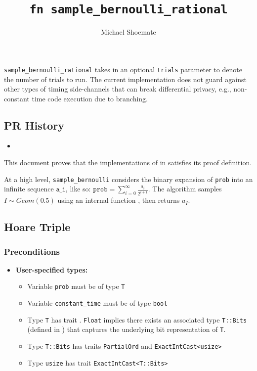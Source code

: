 \documentclass{article}
\title{\texttt{fn sample\_bernoulli\_rational}}
\author{Michael Shoemate}
\begin{document}
\maketitle

\contrib
\begin{tcolorbox}
    \begin{warning}
     \texttt{sample\_bernoulli\_rational} takes in an optional \texttt{trials} parameter to denote the number of trials to run. The current implementation does not guard against other types of timing side-channels that can break differential privacy, e.g., non-constant time code execution due to branching.
    \end{warning}
\end{tcolorbox}

\subsection*{PR History}
\begin{itemize}
    \item {}
\end{itemize}

This document proves that the implementations of  in 
satisfies its proof definition.

At a high level, \texttt{sample\_bernoulli} considers the binary expansion of \texttt{prob} into an infinite sequence $\texttt{a\_i}$,
like so: $\texttt{prob} = \sum_{i = 0}^{\infty} \frac{a_i}{2^{i + 1}}$.
The algorithm samples $I \sim Geom(0.5)$ using an internal function , then returns $a_I$.

\subsection{Hoare Triple}
\subsubsection*{Preconditions}
\begin{itemize}
    \item \textbf{User-specified types:}
    \begin{itemize}
        \item Variable \texttt{prob} must be of type \texttt{T}
        \item Variable \texttt{constant\_time} must be of type \texttt{bool}
        \item Type \texttt{T} has trait .
            \texttt{Float} implies there exists an associated type \texttt{T::Bits} (defined in ) that captures the underlying bit representation of \texttt{T}.
        \item Type \texttt{T::Bits} has traits \texttt{PartialOrd} and \texttt{ExactIntCast<usize>}
        \item Type \texttt{usize} has trait \texttt{ExactIntCast<T::Bits>}
    \end{itemize}
\end{itemize}
\end{document}
